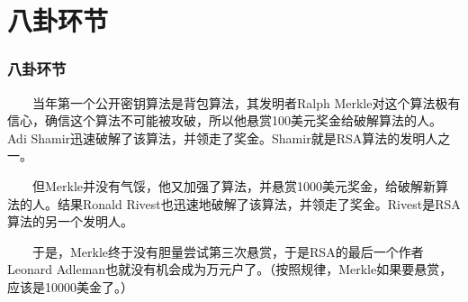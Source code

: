 \documentclass[slidestop,compress,mathserif]{beamer}
\begin{document}
\section{八卦环节}
\begin{frame}
  \transblindsvertical
  \frametitle{八卦环节}
 ~~~~当年第一个公开密钥算法是背包算法，其发明者Ralph Merkle对这个算法极有信心，确信这个算法不可能被攻破，所以他悬赏100美元奖金给破解算法的人。Adi Shamir迅速破解了该算法，并领走了奖金。Shamir就是RSA算法的发明人之一。

 ~~~~但Merkle并没有气馁，他又加强了算法，并悬赏1000美元奖金，给破解新算法的人。结果Ronald Rivest也迅速地破解了该算法，并领走了奖金。Rivest是RSA算法的另一个发明人。

 ~~~~于是，Merkle终于没有胆量尝试第三次悬赏，于是RSA的最后一个作者Leonard Adleman也就没有机会成为万元户了。（按照规律，Merkle如果要悬赏，应该是10000美金了。）
\end{frame}









%
\end{document}
